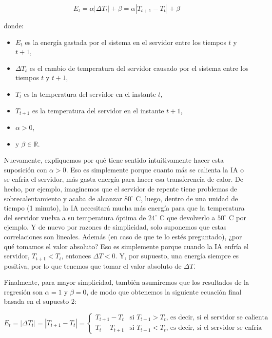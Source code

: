 \documentclass[]{book}
\providecommand{\tightlist}{%
  \setlength{\itemsep}{0pt}\setlength{\parskip}{0pt}}
\begin{document}
\[E_t = \alpha |\Delta T_t| + \beta = \alpha |T_{t+1} - T_t| + \beta\]

donde:

\begin{itemize}
\tightlist
\item
  \(E_t\) es la energía gastada por el sistema en el servidor entre los tiempos \(t\) y \(t +1\),
\item
  \(\Delta T_t\) es el cambio de temperatura del servidor causado por el sistema entre los tiempos \(t\) y \(t +1\),
\item
  \(T_t\) es la temperatura del servidor en el instante \(t\),
\item
  \(T_{t + 1}\) es la temperatura del servidor en el instante \(t +1\),
\item
  \(\alpha > 0\),
\item
  y \(\beta \in \mathbb{R}\).
\end{itemize}

Nuevamente, expliquemos por qué tiene sentido intuitivamente hacer esta suposición con \(\alpha>0\). Eso es simplemente porque cuanto más se calienta la IA o se enfría el servidor, más gasta energía para hacer esa transferencia de calor. De hecho, por ejemplo, imaginemos que el servidor de repente tiene problemas de sobrecalentamiento y acaba de alcanzar \(80^{\circ}\) C, luego, dentro de una unidad de tiempo (1 minuto), la IA necesitará mucha más energía para que la temperatura del servidor vuelva a su temperatura óptima de \(24^{\circ}\) C que devolverlo a \(50^{\circ}\) C por ejemplo. Y de nuevo por razones de simplicidad, solo suponemos que estas correlaciones son lineales. Además (en caso de que te lo estés preguntado), ¿por qué tomamos el valor absoluto? Eso es simplemente porque cuando la IA enfría el servidor, \(T_{t + 1}<T_t\), entonces \(\Delta T <0\). Y, por supuesto, una energía siempre es positiva, por lo que tenemos que tomar el valor absoluto de \(\Delta T\).

Finalmente, para mayor simplicidad, también asumiremos que los resultados de la regresión son \(\alpha = 1\) y \(\beta = 0\), de modo que obtenemos la siguiente ecuación final basada en el supuesto 2:

\begin{equation*}
E_t = |\Delta T_t| = |T_{t+1} - T_t| =
\begin{cases}
T_{t+1} - T_t & \textrm{si $T_{t+1} > T_t$, es decir, si el servidor se calienta} \\
T_t - T_{t+1} & \textrm{si $T_{t+1} < T_t$, es decir, si el servidor se enfria}
\end{cases}
\end{equation*}
\end{document}
